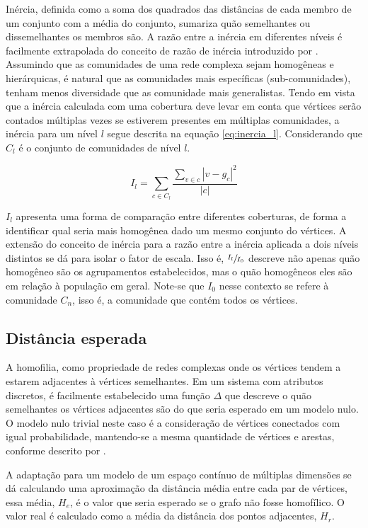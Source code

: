 \documentclass[notes.tex]{subfiles}
\begin{document}
Inércia, definida como a soma dos quadrados das distâncias de cada membro de um conjunto com a média do conjunto, sumariza quão semelhantes ou dissemelhantes os membros são.
A razão entre a inércia em diferentes níveis é facilmente extrapolada do conceito de razão de inércia introduzido por .
Assumindo que as comunidades de uma rede complexa sejam homogêneas e hierárquicas, é natural que as comunidades mais específicas (sub-comunidades), tenham menos diversidade que as comunidade mais generalistas.
Tendo em vista que a inércia calculada com uma cobertura deve levar em conta que vértices serão contados múltiplas vezes se estiverem presentes em múltiplas comunidades, a inércia para um nível $l$ segue descrita na equação \ref{eq:inercia_l}.
Considerando que $C_l$ é o conjunto de comunidades de nível  $l$.

\begin{equation}\label{eq:inercia_l}
    I_l = \sum_{c \in C_l}\frac{\sum_{v \in c} |v-g_c|^2}{|c|}
\end{equation}

$I_l$ apresenta uma forma de comparação entre diferentes coberturas, de forma a identificar qual seria mais homogênea dado um mesmo conjunto do vértices.
A extensão do conceito de inércia para a razão entre a inércia aplicada a dois níveis distintos se dá para isolar o fator de escala.
Isso é, $\sfrac{I_l}{I_0}$ descreve não apenas quão homogêneo são os agrupamentos estabelecidos, mas o quão homogêneos eles são em relação à população em geral.
Note-se que $I_0$ nesse contexto se refere à comunidade $C_n$, isso é, a comunidade que contém todos os vértices.

\subsection{Distância esperada}

A homofilia, como propriedade de redes complexas onde os vértices tendem a estarem adjacentes à vértices semelhantes.
Em um sistema com atributos discretos, é facilmente estabelecido uma função $\Delta$  que descreve o quão semelhantes os vértices adjacentes são do que seria esperado em um modelo nulo.
O modelo nulo trivial neste caso é a consideração de vértices conectados com igual probabilidade, mantendo-se a mesma quantidade de vértices e arestas, conforme descrito por .

A adaptação para um modelo de um espaço contínuo de múltiplas dimensões se dá calculando uma aproximação da distância média entre cada par de vértices, essa média, $H_e$, é o valor que seria esperado se o grafo não fosse homofílico.
O valor real é calculado como a média da distância dos pontos adjacentes, $H_r$.
\end{document}
